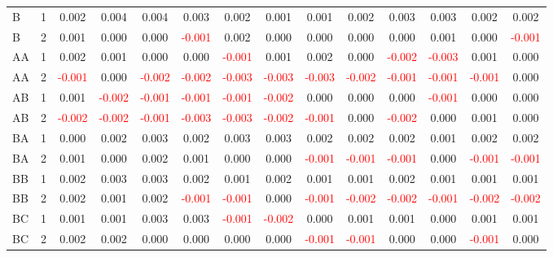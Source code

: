 \begin{table}[H]
{\begin{tabular}{llcccccccccccc}
B & 1 & 0.002 & 0.004 & 0.004 & 0.003 & 0.002 & 0.001 & 0.001 & 0.002 & 0.003 & 0.003 & 0.002 & 0.002\\
B & 2 & 0.001 & 0.000 & 0.000 & \textcolor{red}{-0.001} & 0.002 & 0.000 & 0.000 & 0.000 & 0.000 & 0.001 & 0.000 & \textcolor{red}{-0.001}\\
AA & 1 & 0.002 & 0.001 & 0.000 & 0.000 & \textcolor{red}{-0.001} & 0.001 & 0.002 & 0.000 & \textcolor{red}{-0.002} & \textcolor{red}{-0.003} & 0.001 & 0.000\\
AA & 2 & \textcolor{red}{-0.001} & 0.000 & \textcolor{red}{-0.002} & \textcolor{red}{-0.002} & \textcolor{red}{-0.003} & \textcolor{red}{-0.003} & \textcolor{red}{-0.003} & \textcolor{red}{-0.002} & \textcolor{red}{-0.001} & \textcolor{red}{-0.001} & \textcolor{red}{-0.001} & 0.000\\
AB & 1 & 0.001 & \textcolor{red}{-0.002} & \textcolor{red}{-0.001} & \textcolor{red}{-0.001} & \textcolor{red}{-0.001} & \textcolor{red}{-0.002} & 0.000 & 0.000 & 0.000 & \textcolor{red}{-0.001} & 0.000 & 0.000\\
AB & 2 & \textcolor{red}{-0.002} & \textcolor{red}{-0.002} & \textcolor{red}{-0.001} & \textcolor{red}{-0.003} & \textcolor{red}{-0.003} & \textcolor{red}{-0.002} & \textcolor{red}{-0.001} & 0.000 & \textcolor{red}{-0.002} & 0.000 & 0.001 & 0.000\\
BA & 1 & 0.000 & 0.002 & 0.003 & 0.002 & 0.003 & 0.003 & 0.002 & 0.002 & 0.002 & 0.001 & 0.002 & 0.002\\
BA & 2 & 0.001 & 0.000 & 0.002 & 0.001 & 0.000 & 0.000 & \textcolor{red}{-0.001} & \textcolor{red}{-0.001} & \textcolor{red}{-0.001} & 0.000 & \textcolor{red}{-0.001} & \textcolor{red}{-0.001}\\
BB & 1 & 0.002 & 0.003 & 0.003 & 0.002 & 0.001 & 0.002 & 0.001 & 0.001 & 0.002 & 0.001 & 0.001 & 0.001\\
BB & 2 & 0.002 & 0.001 & 0.002 & \textcolor{red}{-0.001} & \textcolor{red}{-0.001} & 0.000 & \textcolor{red}{-0.001} & \textcolor{red}{-0.002} & \textcolor{red}{-0.002} & \textcolor{red}{-0.001} & \textcolor{red}{-0.002} & \textcolor{red}{-0.002}\\
BC & 1 & 0.001 & 0.001 & 0.003 & 0.003 & \textcolor{red}{-0.001} & \textcolor{red}{-0.002} & 0.000 & 0.001 & 0.001 & 0.000 & 0.001 & 0.001\\
BC & 2 & 0.002 & 0.002 & 0.000 & 0.000 & 0.000 & 0.000 & \textcolor{red}{-0.001} & \textcolor{red}{-0.001} & 0.000 & 0.000 & \textcolor{red}{-0.001} & 0.000\\
\hline
    \end{tabular}%
    }
    \label{tab:cen1_uni}
\end{table}


